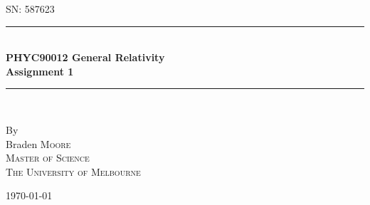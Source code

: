 \documentclass[a4paper]{article} %
\begin{document}
\pagestyle{empty}

\newcommand{\HRule}{\rule{\linewidth}{0.5mm}}

\begin{titlepage}

    \begin{center}
        \textsc{\large SN: 587623}\\[6cm]

        \HRule \\[0.5cm]
		\Huge \textbf{PHYC90012 General Relativity}\\[0.5cm]
        \huge \textbf{Assignment 1}\\[0.5cm] 
        \HRule \\[1.5cm]
        \begin{minipage}{0.4\textwidth}
        \begin{center}

        \large By \\[0.75cm]
        \huge Braden \scshape Moore \\[0.5cm]
        \normalsize \normalfont Master of Science \\
        The University of Melbourne \\

        \end{center}
        \end{minipage}

        \vfill

        \large \today
    \end{center}

\newpage
\end{titlepage}
\pagestyle{fancy}
\lfoot{\textsc{\today}}
\setcounter{page}{1}
\end{document}
